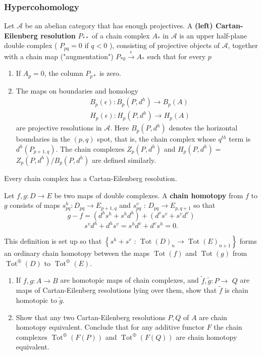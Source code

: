 \begin{example}
\subsubsection{Hypercohomology}
Let $\mathcal{A}$ be an abelian category that has enough projectives. A\textbf{ (left) Cartan-Eilenberg resolution} $P_{* *}$ of a chain complex $A_*$ in $\mathcal{A}$ is an upper half-plane double complex ( $P_{p q}=0$ if $q<0$ ), consisting of projective objects of $\mathcal{A}$, together with a chain map ("augmentation") $P_{* 0} \xrightarrow{\epsilon} A_*$ such that for every $p$
\begin{enumerate}
    \item If $A_p=0$, the column $P_{p *}$ is zero.
    \item The maps on boundaries and homology
    $$
    \begin{aligned}
    & B_p(\epsilon): B_p\left(P, d^h\right) \rightarrow B_p(A) \\
    & H_p(\epsilon): H_p\left(P, d^h\right) \rightarrow H_p(A)
    \end{aligned}
    $$
    are projective resolutions in $\mathcal{A}$. Here $B_p\left(P, d^h\right)$ denotes the horizontal boundaries in the $(p, q)$ spot, that is, the chain complex whose $q^{t h}$ term is $d^h\left(P_{p+1, q}\right)$. The chain complexes $Z_p\left(P, d^h\right)$ and $H_p\left(P, d^h\right)=$ $Z_p\left(P, d^h\right) / B_p\left(P, d^h\right)$ are defined similarly.
\end{enumerate}

\begin{lemm}
    Every chain complex has a Cartan-Eilenberg resolution.
\end{lemm}

Let $f, g: D \rightarrow E$ be two maps of double complexes. A \textbf{chain homotopy} from $f$ to $g$ consists of maps $s_{p q}^h: D_{p q} \rightarrow E_{p+1, q}$ and $s_{p q}^v$ : $D_{p q} \rightarrow E_{p, q+1}$ so that
\[
g-f = (d^h s^h + s^h d^h) + (d^v s^v + s^v d^v)
\]
\[
s^v d^h+d^h s^v=s^h d^v+d^v s^h=0.
\]

This definition is set up so that $\left\{s^h+s^v\right.$ : $\left.\operatorname{Tot}(D)_n \rightarrow \operatorname{Tot}(E)_{n+1}\right\}$ forms an ordinary chain homotopy between the maps $\operatorname{Tot}(f)$ and $\operatorname{Tot}(g)$ from $\operatorname{Tot}^{\oplus}(D)$ to $\operatorname{Tot}^{\oplus}(E)$.

\begin{prop}
    \begin{enumerate}
        \item If $f, g: A \rightarrow B$ are homotopic maps of chain complexes, and $\tilde{f}, \tilde{g}: P \rightarrow$ $Q$ are maps of Cartan-Eilenberg resolutions lying over them, show that $\tilde{f}$ is chain homotopic to $\tilde{g}$.
        \item Show that any two Cartan-Eilenberg resolutions $P, Q$ of $A$ are chain homotopy equivalent. Conclude that for any additive functor $F$ the chain complexes $\operatorname{Tot}^{\oplus}(F(P))$ and $\operatorname{Tot}^{\oplus}(F(Q))$ are chain homotopy equivalent.
    \end{enumerate}
\end{prop}



\end{example}
